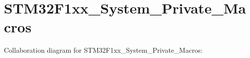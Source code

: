 \hypertarget{group__STM32F1xx__System__Private__Macros}{}\section{S\+T\+M32\+F1xx\+\_\+\+System\+\_\+\+Private\+\_\+\+Macros}
\label{group__STM32F1xx__System__Private__Macros}
Collaboration diagram for S\+T\+M32\+F1xx\+\_\+\+System\+\_\+\+Private\+\_\+\+Macros\+:

